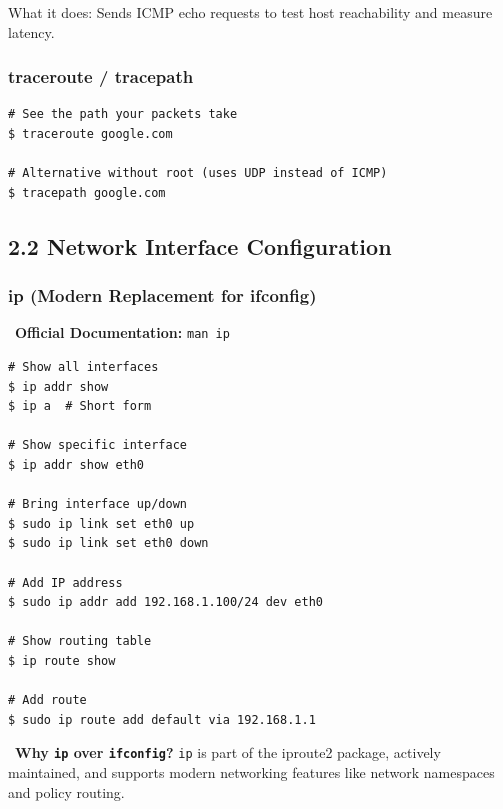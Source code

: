 \documentclass[12pt]{article}
\newcommand{\bookicon}{\faBook}
\begin{document}
What it does: Sends ICMP echo requests to test host reachability and measure latency.

\subsubsection*{traceroute / tracepath}

\begin{highlightbox}
\begin{verbatim}
# See the path your packets take
$ traceroute google.com

# Alternative without root (uses UDP instead of ICMP)
$ tracepath google.com
\end{verbatim}
\end{highlightbox}

\subsection*{2.2 Network Interface Configuration}

\subsubsection*{ip (Modern Replacement for ifconfig)}

\begin{infobox}
\bookicon\ \textbf{Official Documentation:} \texttt{man ip}
\end{infobox}

\begin{highlightbox}
\begin{verbatim}
# Show all interfaces
$ ip addr show
$ ip a  # Short form

# Show specific interface
$ ip addr show eth0

# Bring interface up/down
$ sudo ip link set eth0 up
$ sudo ip link set eth0 down

# Add IP address
$ sudo ip addr add 192.168.1.100/24 dev eth0

# Show routing table
$ ip route show

# Add route
$ sudo ip route add default via 192.168.1.1
\end{verbatim}
\end{highlightbox}

\begin{infobox}
\faQuestionCircle\ \textbf{Why \texttt{ip} over \texttt{ifconfig}?} \texttt{ip} is part of the iproute2 package, actively maintained, and supports modern networking features like network namespaces and policy routing.
\end{infobox}
\end{document}
